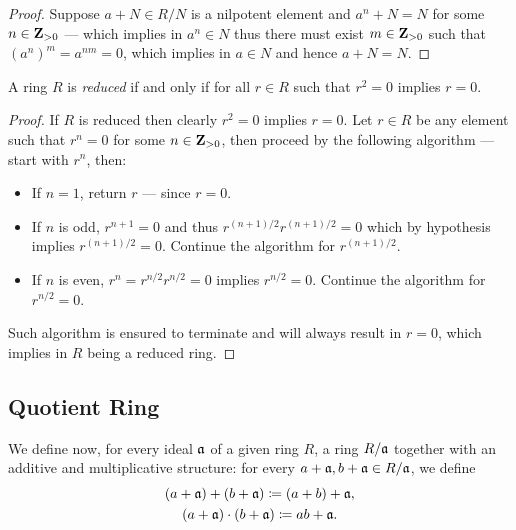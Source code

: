 \begin{proof}
Suppose \(a + N \in R/N\) is a nilpotent element and \(a^n + N = N\) for some
\(n \in \mathbf{Z}_{>0}\) --- which implies in \(a^n \in N\) thus there must exist
\(m \in \mathbf{Z}_{>0}\) such that \((a^n)^m = a^{nm} = 0\), which implies in
\(a \in N\) and hence \(a + N = N\).
\end{proof}

\begin{lemma}
\label{lem:reduced-iff-r2=0-implies-r=0}
A ring \(R\) is \emph{reduced} if and only if for all \(r \in R\) such that
\(r^2 = 0\) implies \(r = 0\).
\end{lemma}

\begin{proof}
If \(R\) is reduced then clearly \(r^2 = 0\) implies \(r = 0\). Let \(r \in R\)
be any element such that \(r^n = 0\) for some \(n \in \mathbf{Z}_{>0}\), then proceed
by the following algorithm --- start with \(r^n\), then:
\begin{itemize}\setlength\itemsep{0em}
\item If \(n = 1\), return \(r\) --- since \(r = 0\).
\item If \(n\) is odd, \(r^{n + 1} = 0\) and thus
  \(r^{(n+1)/2} r^{(n+1)/2} = 0\) which by hypothesis implies \(r^{(n+1)/2} =
  0\). Continue the algorithm for \(r^{(n+1)/2}\).
\item If \(n\) is even, \(r^n = r^{n/2} r^{n/2} = 0\) implies \(r^{n/2} =
  0\). Continue the algorithm for \(r^{n/2} = 0\).
\end{itemize}
Such algorithm is ensured to terminate and will always result in \(r = 0\),
which implies in \(R\) being a reduced ring.
\end{proof}

\subsection{Quotient Ring}

We define now, for every ideal \(\mathfrak{a}\) of a given ring \(R\), a ring
\(R/\mathfrak{a}\) together with an additive and multiplicative structure: for
every \(a + \mathfrak{a}, b + \mathfrak{a} \in R/\mathfrak{a}\), we define
\begin{gather*}
(a + \mathfrak{a}) + (b + \mathfrak{a}) \coloneq (a + b) + \mathfrak{a}, \\
(a + \mathfrak{a}) \cdot (b + \mathfrak{a}) \coloneq a b + \mathfrak{a}.
\end{gather*}

